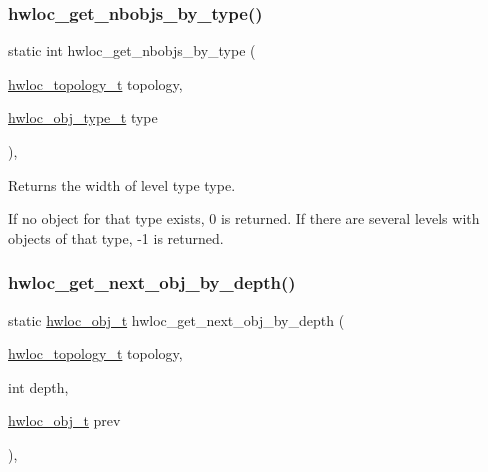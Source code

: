 \subsubsection{\texorpdfstring{hwloc\+\_\+get\+\_\+nbobjs\+\_\+by\+\_\+type()}{hwloc\_get\_nbobjs\_by\_type()}}
{\footnotesize\ttfamily static int hwloc\+\_\+get\+\_\+nbobjs\+\_\+by\+\_\+type (\begin{DoxyParamCaption}\item[{\hyperlink{a00186_ga9d1e76ee15a7dee158b786c30b6a6e38}{hwloc\+\_\+topology\+\_\+t}}]{topology,  }\item[{\hyperlink{a00184_gacd37bb612667dc437d66bfb175a8dc55}{hwloc\+\_\+obj\+\_\+type\+\_\+t}}]{type }\end{DoxyParamCaption})\hspace{0.3cm}{\ttfamily [inline]}, {\ttfamily [static]}}



Returns the width of level type {\ttfamily type}. 

If no object for that type exists, 0 is returned. If there are several levels with objects of that type, -\/1 is returned. \mbox{\label{a00187_gac140a9b939d9fa0b30c4a910efcb0656}} 
\subsubsection{\texorpdfstring{hwloc\+\_\+get\+\_\+next\+\_\+obj\+\_\+by\+\_\+depth()}{hwloc\_get\_next\_obj\_by\_depth()}}
{\footnotesize\ttfamily static \hyperlink{a00185_ga79b8ab56877ef99ac59b833203391c7d}{hwloc\+\_\+obj\+\_\+t} hwloc\+\_\+get\+\_\+next\+\_\+obj\+\_\+by\+\_\+depth (\begin{DoxyParamCaption}\item[{\hyperlink{a00186_ga9d1e76ee15a7dee158b786c30b6a6e38}{hwloc\+\_\+topology\+\_\+t}}]{topology,  }\item[{int}]{depth,  }\item[{\hyperlink{a00185_ga79b8ab56877ef99ac59b833203391c7d}{hwloc\+\_\+obj\+\_\+t}}]{prev }\end{DoxyParamCaption})\hspace{0.3cm}{\ttfamily [inline]}, {\ttfamily [static]}}



